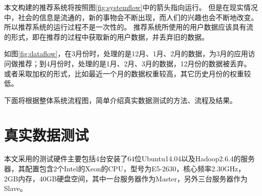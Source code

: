 \begin{center}
\def\sysleft{
    \node at (0,0) [rectangle,draw] {Data from \textbf{Feb}};
    \node at (0,1) [rectangle,draw] {Data from \textbf{Jan}};
    \node at (0,2) [rectangle,draw] {Data from \textbf{Dec}};
    \node at (0,5) [rectangle,draw] {Data from \textbf{Nov}};
    \node at (0,3) [align=center] {\textbf{Data proccessing}\\
             \textbf{in Recommend system}};
    \draw (-2.2,-1) rectangle (2.2,4);
}
\def\sysright{
    \node at (0,0) [rectangle,draw] {Data from \textbf{Mar}};
    \node at (0,1) [rectangle,draw] {Data from \textbf{Feb}};
    \node at (0,2) [rectangle,draw] {Data from \textbf{Jan}};
    \node at (0,5) [rectangle,draw] {Data from \textbf{Dec}};
    \node at (0,3) [align=center] {\textbf{Data proccessing}\\
             \textbf{in Recommend system}};
    \draw (-2.2,-1) rectangle (2.2,4);
}
\label{fig:dataflow}
\end{center}

本文构建的推荐系统将按照图\ref{fig:systemflow}中的箭头指向运行。
但是在现实情况中，社会的信息是流通的，新的事物会不断出现，而人们的兴趣也会不断地改变。
所以推荐系统的运行过程不是一次性的。
推荐系统所使用的用户数据应该具有流的形式，即在推荐的过程中获取新的用户数据，并丢弃旧的数据。

如图\ref{fig:dataflow}，在3月份时，处理的是12月、1月、2月的数据，为3月的应用访问做推荐；到4月份时，处理的是1月、2月、3月的数据，12月份的数据被丢弃。
或者采取加权的形式，比如最近一个月的数据权重较高，其它历史月份的权重较低。

下面将根据整体系统流程图，简单介绍真实数据测试的方法、流程及结果。
\section{真实数据测试}
本文采用的测试硬件主要包括4台安装了64位Ubuntu14.04以及Hadoop2.6.4的服务器，其配置包含2个Intel的Xeon的CPU，型号为E5-2630，核心频率2.30GHz，2GB内存，40GB硬盘空间，其中一台服务器作为Master，另外三台服务器作为Slave。


